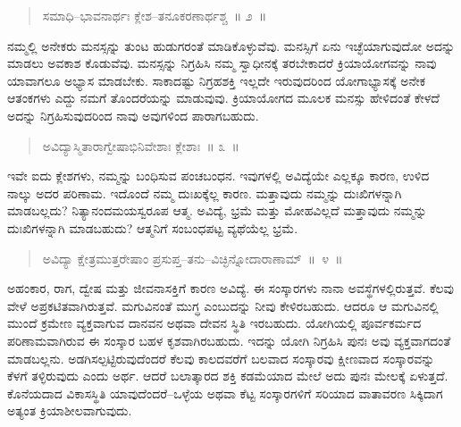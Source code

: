 \vspace{-0.3cm}

\begin{verse}
ಸಮಾಧಿ–ಭಾವನಾರ್ಥಃ ಕ್ಲೇಶ–ತನೂಕರಣಾರ್ಥಶ್ಚ~॥ ೨~॥
\end{verse}

\vspace{-0.3cm}


ನಮ್ಮಲ್ಲಿ ಅನೇಕರು ಮನಸ್ಸನ್ನು ತುಂಟ ಹುಡುಗರಂತೆ ಮಾಡಿಕೊಳ್ಳುವೆವು. ಮನಸ್ಸಿಗೆ ಏನು ಇಚ್ಛೆಯಾಗುವುದೋ ಅದನ್ನು ಮಾಡಲು ಅವಕಾಶ ಕೊಡುವೆವು. ಮನಸ್ಸನ್ನು ನಿಗ್ರಹಿಸಿ ನಮ್ಮ ಸ್ವಾಧೀನಕ್ಕೆ ತರಬೇಕಾದರೆ ಕ್ರಿಯಾಯೋಗವನ್ನು ನಾವು ಯಾವಾಗಲೂ ಅಭ್ಯಾಸ ಮಾಡಬೇಕು. ಸಾಕಾದಷ್ಟು ನಿಗ್ರಹಶಕ್ತಿ ಇಲ್ಲದೇ ಇರುವುದರಿಂದ ಯೋಗಾಭ್ಯಾಸಕ್ಕೆ ಅನೇಕ ಆತಂಕಗಳು ಎದ್ದು ನಮಗೆ ತೊಂದರೆಯನ್ನು ಮಾಡುವುವು. ಕ್ರಿಯಾಯೋಗದ ಮೂಲಕ ಮನಸ್ಸು ಹೇಳಿದಂತೆ ಕೇಳದೆ ಅದನ್ನು ನಿಗ್ರಹಿಸುವುದರಿಂದ ನಾವು ಅವುಗಳಿಂದ ಪಾರಾಗಬಹುದು. 

\vspace{-0.3cm}

\begin{verse}
ಅವಿದ್ಯಾಸ್ಮಿತಾರಾಗ್ವೇಷಾಭಿನಿವೇಶಾಃ ಕ್ಲೇಶಾಃ~॥ ೩~॥
\end{verse}

\vspace{-0.3cm}


\vskip 0.2cm

ಇವೇ ಐದು ಕ್ಲೇಶಗಳು, ನಮ್ಮನ್ನು ಬಂಧಿಸುವ ಪಂಚಬಂಧನ. ಇವುಗಳಲ್ಲಿ ಅವಿದ್ಯೆಯೇ ಎಲ್ಲಕ್ಕೂ ಕಾರಣ, ಉಳಿದ ನಾಲ್ಕು ಅದರ ಪರಿಣಾಮ. ಇದೊಂದೆ ನಮ್ಮ ದುಃಖಕ್ಕೆಲ್ಲ ಕಾರಣ. ಮತ್ತಾವುದು ನಮ್ಮನ್ನು ದುಃಖಿಗಳನ್ನಾಗಿ ಮಾಡಬಲ್ಲದು? ನಿತ್ಯಾನಂದಮಯಸ್ವರೂಪ ಆತ್ಮ. ಅವಿದ್ಯೆ, ಭ್ರಮೆ ಮತ್ತು ಮೋಹವಿಲ್ಲದೆ ಮತ್ತಾವುದು ನಮ್ಮನ್ನು ದುಃಖಿಗಳನ್ನಾಗಿ ಮಾಡಬಹುದು? ಆತ್ಮನಿಗೆ ಸಂಬಂಧಪಟ್ಟ ವ್ಯಥೆಯೆಲ್ಲ ಭ್ರಮೆ. 

\vspace{-0.3cm}

\begin{verse}
ಅವಿದ್ಯಾ ಕ್ಷೇತ್ರಮುತ್ತರೇಷಾಂ ಪ್ರಸುಪ್ತ–ತನು–ವಿಚ್ಛಿನ್ನೋದಾರಾಣಾಮ್​~॥~೪~॥
\end{verse}

\vspace{-0.3cm}


\vskip 0.2cm

ಅಹಂಕಾರ, ರಾಗ, ದ್ವೇಷ ಮತ್ತು ಜೀವನಾಸಕ್ತಿಗೆ ಕಾರಣ ಅವಿದ್ಯೆ. ಈ ಸಂಸ್ಕಾರಗಳು ನಾನಾ ಅವಸ್ಥೆಗಳಲ್ಲಿರುತ್ತವೆ. ಕೆಲವು ವೇಳೆ ಅಪ್ರಕಟಿತವಾಗಿರುತ್ತವೆ. ಮಗುವಿನಂತೆ ಮುಗ್ಧ ಎಂಬುದನ್ನು ನೀವು ಕೇಳಿರಬಹುದು. ಆದರೂ ಆ ಮಗುವಿನಲ್ಲಿ ಮುಂದೆ ಕ್ರಮೇಣ ವ್ಯಕ್ತವಾಗುವ ದಾನವನ ಅಥವಾ ದೇವನ ಸ್ಥಿತಿ ಇರಬಹುದು. ಯೋಗಿಯಲ್ಲಿ ಪೂರ್ವಕರ್ಮದ ಪರಿಣಾಮವಾಗಿರುವ ಈ ಸಂಸ್ಕಾರ ಬಹಳ ಕೃಶವಾಗಿರಬಹುದು. ಇದನ್ನು ಯೋಗಿ ನಿಗ್ರಹಿಸಿ ಪುನಃ ಅವು ವ್ಯಕ್ತವಾಗದಂತೆ ಮಾಡಬಲ್ಲನು. ಅಡಗಿಸಲ್ಪಟ್ಟಿರುವುದೆಂದರೆ ಕೆಲವು ಕಾಲದವರೆಗೆ ಬಲವಾದ ಸಂಸ್ಕಾರವು ಕ್ಷೀಣವಾದ ಸಂಸ್ಕಾರವನ್ನು ಕೆಳಗೆ ತಳ್ಳಿರುವುದು ಎಂದು ಅರ್ಥ. ಆದರೆ ಬಲಾತ್ಕಾರದ ಶಕ್ತಿ ಕಡಮೆಯಾದ ಮೇಲೆ ಅದು ಪುನಃ ಮೇಲಕ್ಕೆ ಏಳುತ್ತದೆ. ಕೊನೆಯದಾದ ವಿಕಾಸಸ್ಥಿತಿ ಯಾವುದೆಂದರೆ–ಒಳ್ಳೆಯ ಅಥವಾ ಕೆಟ್ಟ ಸಂಸ್ಕಾರಗಳಿಗೆ ಸರಿಯಾದ ವಾತಾವರಣ ಸಿಕ್ಕಿದಾಗ ಅತ್ಯಂತ ಕ್ರಿಯಾಶೀಲವಾಗುವುದು. 

